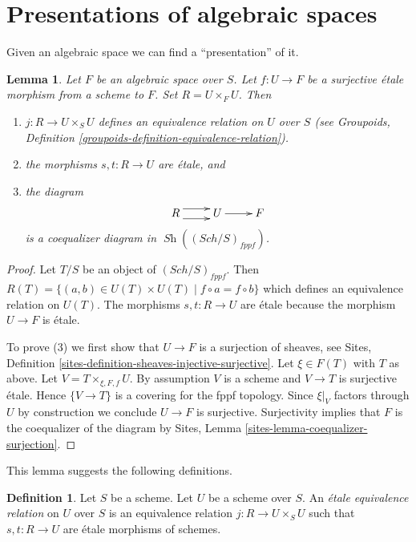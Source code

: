 \documentclass{stacks-project}
\theoremstyle{plain}
\newtheorem{lemma}[subsection]{Lemma}
\theoremstyle{definition}
\newtheorem{definition}[subsection]{Definition}
\theoremstyle{remark}
\numberwithin{equation}{subsection}
\def\Sch{\mathit{Sch}}
\def\Sh{\mathop{\mathit{Sh}}\nolimits}
\begin{document}
\section{Presentations of algebraic spaces}
\label{section-presentations}

\noindent
Given an algebraic space we can find a ``presentation'' of it.


\begin{lemma}
\label{lemma-space-presentation}
Let $F$ be an algebraic space over $S$. Let $f : U \to F$ be a
surjective \'etale morphism from a scheme to $F$. Set $R = U \times_F U$.
Then
\begin{enumerate}
\item $j : R \to U \times_S U$ defines an equivalence relation on
$U$ over $S$ (see
Groupoids, Definition \ref{groupoids-definition-equivalence-relation}).
\item the morphisms $s, t : R \to U$ are \'etale, and
\item the diagram
$$
\xymatrix{
R \ar@<1ex>[r] \ar@<-1ex>[r] &
U \ar[r] &
F
}
$$
is a coequalizer diagram in $\Sh((\Sch/S)_{fppf})$.
\end{enumerate}
\end{lemma}

\begin{proof}
Let $T/S$ be an object of $(\Sch/S)_{fppf}$.
Then $R(T) = \{(a, b) \in U(T) \times U(T) \mid f \circ a = f \circ b\}$
which defines an equivalence relation on $U(T)$.
The morphisms $s, t : R \to U$ are \'etale because the morphism
$U \to F$ is \'etale.

\medskip\noindent
To prove (3) we first show that
$U \to F$ is a surjection of sheaves, see
Sites, Definition \ref{sites-definition-sheaves-injective-surjective}.
Let $\xi \in F(T)$ with $T$ as above. Let $V = T \times_{\xi, F, f}U$.
By assumption $V$ is a scheme and $V \to T$ is surjective \'etale.
Hence $\{V \to T\}$ is a covering for the fppf topology.
Since $\xi|_V$ factors through $U$ by construction we
conclude $U \to F$ is surjective. Surjectivity implies that
$F$ is the coequalizer of the diagram by
Sites, Lemma \ref{sites-lemma-coequalizer-surjection}.
\end{proof}

\noindent
This lemma suggests the following definitions.

\begin{definition}
\label{definition-etale-equivalence-relation}
Let $S$ be a scheme. Let $U$ be a scheme over $S$.
An {\it \'etale equivalence relation} on $U$ over $S$
is an equivalence relation $j : R \to U \times_S U$
such that $s, t : R \to U$ are \'etale morphisms of schemes.
\end{definition}
\end{document}
